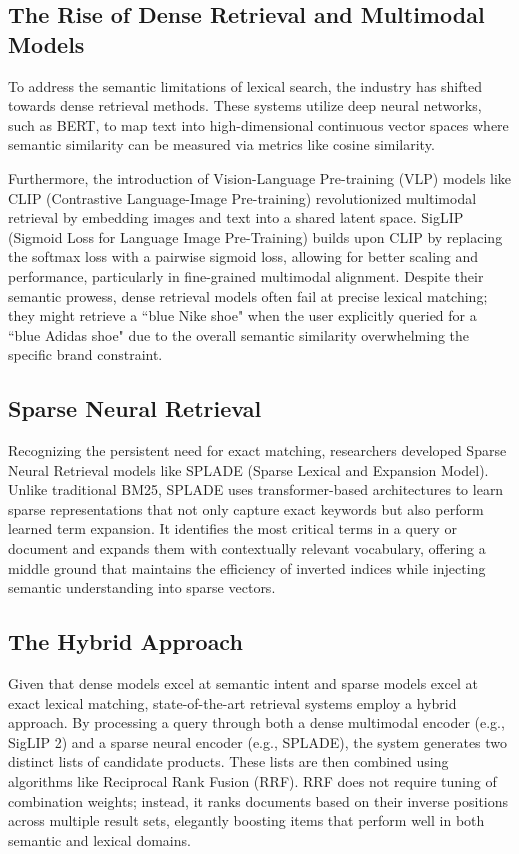 \documentclass[12pt, a4paper]{article}
\begin{document}
\subsection{The Rise of Dense Retrieval and Multimodal Models}
To address the semantic limitations of lexical search, the industry has shifted towards dense retrieval methods. These systems utilize deep neural networks, such as BERT, to map text into high-dimensional continuous vector spaces where semantic similarity can be measured via metrics like cosine similarity. 

Furthermore, the introduction of Vision-Language Pre-training (VLP) models like CLIP (Contrastive Language-Image Pre-training) revolutionized multimodal retrieval by embedding images and text into a shared latent space. SigLIP (Sigmoid Loss for Language Image Pre-Training) builds upon CLIP by replacing the softmax loss with a pairwise sigmoid loss, allowing for better scaling and performance, particularly in fine-grained multimodal alignment. Despite their semantic prowess, dense retrieval models often fail at precise lexical matching; they might retrieve a ``blue Nike shoe" when the user explicitly queried for a ``blue Adidas shoe" due to the overall semantic similarity overwhelming the specific brand constraint.

\subsection{Sparse Neural Retrieval}
Recognizing the persistent need for exact matching, researchers developed Sparse Neural Retrieval models like SPLADE (Sparse Lexical and Expansion Model). Unlike traditional BM25, SPLADE uses transformer-based architectures to learn sparse representations that not only capture exact keywords but also perform learned term expansion. It identifies the most critical terms in a query or document and expands them with contextually relevant vocabulary, offering a middle ground that maintains the efficiency of inverted indices while injecting semantic understanding into sparse vectors.

\subsection{The Hybrid Approach}
Given that dense models excel at semantic intent and sparse models excel at exact lexical matching, state-of-the-art retrieval systems employ a hybrid approach. By processing a query through both a dense multimodal encoder (e.g., SigLIP 2) and a sparse neural encoder (e.g., SPLADE), the system generates two distinct lists of candidate products. These lists are then combined using algorithms like Reciprocal Rank Fusion (RRF). RRF does not require tuning of combination weights; instead, it ranks documents based on their inverse positions across multiple result sets, elegantly boosting items that perform well in both semantic and lexical domains.
\end{document}
